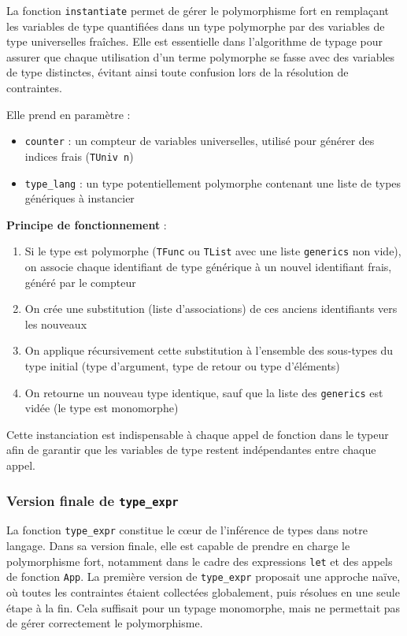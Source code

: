 La fonction \texttt{instantiate} permet de gérer le polymorphisme fort en remplaçant les variables de type quantifiées dans un type polymorphe par des variables de type universelles fraîches. 
Elle est essentielle dans l'algorithme de typage pour assurer que chaque utilisation d'un terme polymorphe se fasse avec des variables de type distinctes, évitant ainsi toute confusion lors de la résolution de contraintes.

Elle prend en paramètre :
\begin{itemize}
  \item \texttt{counter} : un compteur de variables universelles, utilisé pour générer des indices frais (\texttt{TUniv n})
  \item \texttt{type\_lang} : un type potentiellement polymorphe contenant une liste de types génériques à instancier
\end{itemize}

\textbf{Principe de fonctionnement} :
\begin{enumerate}
  \item Si le type est polymorphe (\texttt{TFunc} ou \texttt{TList} avec une liste \texttt{generics} non vide), on associe chaque identifiant de type générique à un nouvel identifiant frais, généré par le compteur
  \item On crée une substitution (liste d’associations) de ces anciens identifiants vers les nouveaux
  \item On applique récursivement cette substitution à l'ensemble des sous-types du type initial (type d'argument, type de retour ou type d'éléments)
  \item On retourne un nouveau type identique, sauf que la liste des \texttt{generics} est vidée (le type est monomorphe)
\end{enumerate}

Cette instanciation est indispensable à chaque appel de fonction dans le typeur afin de garantir que les variables de type restent indépendantes entre chaque appel.

\subsubsection{Version finale de \texttt{type\_expr}}

La fonction \texttt{type\_expr} constitue le cœur de l'inférence de types dans notre langage. Dans sa version finale, elle est capable de prendre en charge le polymorphisme fort, notamment dans le cadre des expressions \texttt{let} et des appels de fonction \texttt{App}.
La première version de \texttt{type\_expr} proposait une approche naïve, où toutes les contraintes étaient collectées globalement, puis résolues en une seule étape à la fin. Cela suffisait pour un typage monomorphe, mais ne permettait pas de gérer correctement le polymorphisme.

